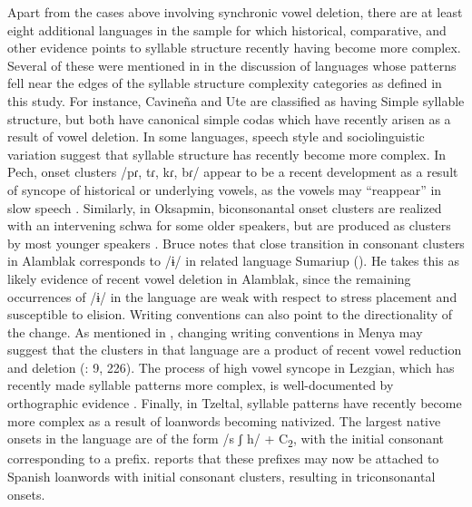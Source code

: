   Apart from the cases above involving synchronic vowel deletion, there are at least eight additional languages in the sample for which historical, comparative, and other evidence points to syllable structure recently having become more complex. Several of these were mentioned in  in the discussion of languages whose patterns fell near the edges of the syllable structure complexity categories as defined in this study. For instance, Cavineña and Ute are classified as having Simple syllable structure, but both have canonical simple codas which have recently arisen as a result of vowel deletion. In some languages, speech style and sociolinguistic variation suggest that syllable structure has recently become more complex. In Pech, onset clusters /pɾ, tɾ, kɾ, bɾ/ appear to be a recent development as a result of syncope of historical or underlying vowels, as the vowels may “reappear” in slow speech \citep[20]{Holt1999}. Similarly, in Oksapmin, biconsonantal onset clusters are realized with an intervening schwa for some older speakers, but are produced as clusters by most younger speakers \citep[65--67]{Loughnane2009}. Bruce notes that close transition in consonant clusters in Alamblak corresponds to /ɨ/ in related language Sumariup (\citeyear[69--70]{Bruce1984}). He takes this as likely evidence of recent vowel deletion in Alamblak, since the remaining occurrences of /ɨ/ in the language are weak with respect to stress placement and susceptible to elision. Writing conventions can also point to the directionality of the change. As mentioned in , changing writing conventions in Menya may suggest that the clusters in that language are a product of recent vowel reduction and deletion (\citealt{Whitehead2004}: 9, 226). The process of high vowel syncope in Lezgian, which has recently made syllable patterns more complex, is well-documented by orthographic evidence \citep[36--38]{Haspelmath1993}. Finally, in Tzeltal, syllable patterns have recently become more complex as a result of loanwords becoming nativized. The largest native onsets in the language are of the form /s ʃ h/ + C\textsubscript{2}, with the initial consonant corresponding to a prefix. \citep[14]{Kaufman1971} reports that these prefixes may now be attached to Spanish loanwords with initial consonant clusters, resulting in triconsonantal onsets.

